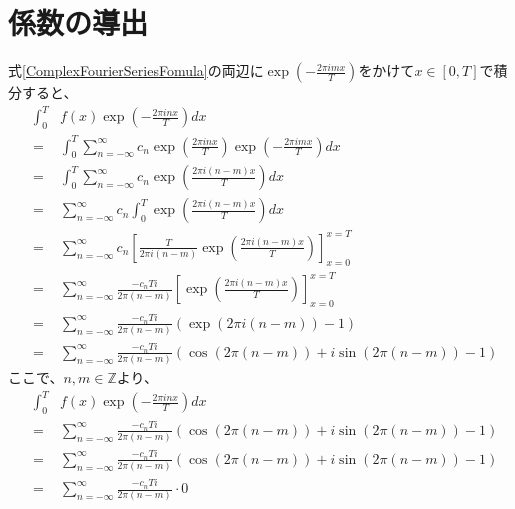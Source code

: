 \documentclass[a4paper]{jsarticle}
\begin{document}
\section{係数の導出}
式\ref{ComplexFourierSeriesFomula}の両辺に$ \exp \left( - \frac { 2 \pi imx } { T } \right) $をかけて$ x \in \left[ 0,T \right] $で積分すると、
\begin{eqnarray}
	& \int _0 ^T & f \left( x \right) \exp \left( - \frac { 2 \pi inx } { T } \right) dx \nonumber \\
	&=& \int _0 ^T \sum _{ n = - \infty } ^\infty c_n \exp \left( \frac { 2 \pi inx } { T } \right) \exp \left( - \frac { 2 \pi imx } { T } \right) dx \nonumber \\
	&=& \int _0 ^T \sum _{ n = - \infty } ^\infty c_n \exp \left( \frac { 2 \pi i \left( n - m \right) x } { T } \right) dx \nonumber \\
	&=& \sum _{ n = - \infty } ^\infty c_n \int _0 ^T \exp \left( \frac { 2 \pi i \left( n - m \right) x } { T } \right) dx \nonumber \\
	&=& \sum _{ n = - \infty } ^\infty c_n \left[ \frac { T } { 2 \pi i \left( n - m \right) } \exp \left( \frac { 2 \pi i \left( n - m \right) x } { T } \right) \right] _{ x = 0 } ^{ x = T } \nonumber \\
	&=& \sum _{ n = - \infty } ^\infty \frac { -c_nTi } { 2 \pi \left( n - m \right) } \left[ \exp \left( \frac { 2 \pi i \left( n - m \right) x } { T } \right) \right] _{ x = 0 } ^{ x = T } \nonumber \\
	&=& \sum _{ n = - \infty } ^\infty \frac { -c_nTi } { 2 \pi \left( n - m \right) } \left( \exp \left( 2 \pi i \left( n - m \right) \right) - 1 \right) \nonumber \\
	&=& \sum _{ n = - \infty } ^\infty \frac { -c_nTi } { 2 \pi \left( n - m \right) } \left( \cos \left( 2 \pi \left( n - m \right) \right) + i \sin \left( 2 \pi \left( n - m \right) \right) - 1 \right)
\end{eqnarray}
ここで、$ n,m \in \mathbb{Z} $より、
\begin{eqnarray}
	& \int _0 ^T & f \left( x \right) \exp \left( - \frac { 2 \pi inx } { T } \right) dx \nonumber \\
	&=& \sum _{ n = - \infty } ^\infty \frac { -c_nTi } { 2 \pi \left( n - m \right) } \left( \cos \left( 2 \pi \left( n - m \right) \right) + i \sin \left( 2 \pi \left( n - m \right) \right) - 1 \right) \nonumber \\
	&=& \sum _{ n = - \infty } ^\infty \frac { -c_nTi } { 2 \pi \left( n - m \right) } \left( \cos \left( 2 \pi \left( n - m \right) \right) + i \sin \left( 2 \pi \left( n - m \right) \right) - 1 \right) \nonumber \\
	&=& \sum _{ n = - \infty } ^\infty \frac { -c_nTi } { 2 \pi \left( n - m \right) } \cdot 0 \nonumber \\
\end{eqnarray}
\end{document}
